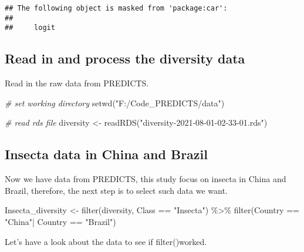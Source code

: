 \documentclass[
]{article}
\newenvironment{Shaded}{\begin{snugshade}}{\end{snugshade}}
\newcommand{\CommentTok}[1]{\textcolor[rgb]{0.56,0.35,0.01}{\textit{#1}}}
\newcommand{\FunctionTok}[1]{\textcolor[rgb]{0.00,0.00,0.00}{#1}}
\newcommand{\NormalTok}[1]{#1}
\newcommand{\OtherTok}[1]{\textcolor[rgb]{0.56,0.35,0.01}{#1}}
\newcommand{\SpecialCharTok}[1]{\textcolor[rgb]{0.00,0.00,0.00}{#1}}
\newcommand{\StringTok}[1]{\textcolor[rgb]{0.31,0.60,0.02}{#1}}
\begin{document}
\begin{verbatim}
## The following object is masked from 'package:car':
## 
##     logit
\end{verbatim}

\hypertarget{read-in-and-process-the-diversity-data}{%
\subsection{Read in and process the diversity
data}\label{read-in-and-process-the-diversity-data}}

Read in the raw data from PREDICTS.

\begin{Shaded}
\begin{Highlighting}[]
\CommentTok{\# set working directory}
\FunctionTok{setwd}\NormalTok{(}\StringTok{"F:/Code\_PREDICTS/data"}\NormalTok{)}

\CommentTok{\# read rds file}
\NormalTok{diversity }\OtherTok{\textless{}{-}} \FunctionTok{readRDS}\NormalTok{(}\StringTok{"diversity{-}2021{-}08{-}01{-}02{-}33{-}01.rds"}\NormalTok{)}
\end{Highlighting}
\end{Shaded}

\hypertarget{insecta-data-in-china-and-brazil}{%
\subsection{Insecta data in China and
Brazil}\label{insecta-data-in-china-and-brazil}}

Now we have data from PREDICTS, this study focus on insecta in China and
Brazil, therefore, the next step is to select such data we want.

\begin{Shaded}
\begin{Highlighting}[]
\NormalTok{Insecta\_diversity }\OtherTok{\textless{}{-}} \FunctionTok{filter}\NormalTok{(diversity, Class }\SpecialCharTok{==} \StringTok{"Insecta"}\NormalTok{) }\SpecialCharTok{\%\textgreater{}\%}
                      \FunctionTok{filter}\NormalTok{(Country }\SpecialCharTok{==} \StringTok{"China"}\SpecialCharTok{|}\NormalTok{ Country }\SpecialCharTok{==} \StringTok{"Brazil"}\NormalTok{)}
\end{Highlighting}
\end{Shaded}

Let's have a look about the data to see if filter()worked.

\begin{Shaded}
\end{Shaded}
\end{document}
